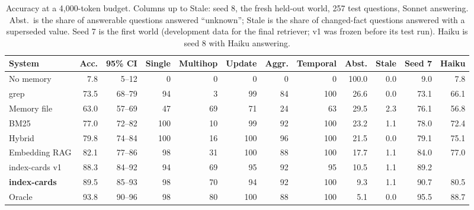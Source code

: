 \begin{table}[t]\centering\small
\caption{Accuracy at a 4{,}000-token budget. Columns up to Stale: seed 8, the fresh held-out world, 257 test questions, Sonnet answering. Abst.\ is the share of answerable questions answered ``unknown''; Stale is the share of changed-fact questions answered with a superseded value. Seed 7 is the first world (development data for the final retriever; v1 was frozen before its test run). Haiku is seed 8 with Haiku answering.}\label{tab:main}
\begin{tabular}{lrrrrrrrrrrr}\toprule
System & Acc. & 95\% CI & Single & Multihop & Update & Aggr. & Temporal & Abst. & Stale & Seed 7 & Haiku \\
\midrule
No memory & 7.8 & 5--12 & 0 & 0 & 0 & 0 & 0 & 100.0 & 0.0 & 9.0 & 7.8 \\
grep & 73.5 & 68--79 & 94 & 3 & 99 & 84 & 100 & 26.6 & 0.0 & 73.1 & 66.1 \\
Memory file & 63.0 & 57--69 & 47 & 69 & 71 & 24 & 63 & 29.5 & 2.3 & 76.1 & 56.8 \\
BM25 & 77.0 & 72--82 & 100 & 10 & 99 & 92 & 100 & 23.2 & 1.1 & 78.0 & 72.4 \\
Hybrid & 79.8 & 74--84 & 100 & 16 & 100 & 96 & 100 & 21.5 & 0.0 & 79.1 & 75.1 \\
Embedding RAG & 82.1 & 77--86 & 98 & 31 & 100 & 88 & 100 & 17.7 & 1.1 & 84.0 & 77.0 \\
index-cards v1 & 88.3 & 84--92 & 94 & 69 & 95 & 92 & 95 & 10.5 & 1.1 & 89.2 &  \\
\textbf{index-cards} & 89.5 & 85--93 & 98 & 70 & 94 & 92 & 100 & 9.3 & 1.1 & 90.7 & 80.5 \\
Oracle & 93.8 & 90--96 & 98 & 80 & 100 & 88 & 100 & 5.1 & 0.0 & 95.5 & 88.7 \\
\bottomrule\end{tabular}\end{table}
